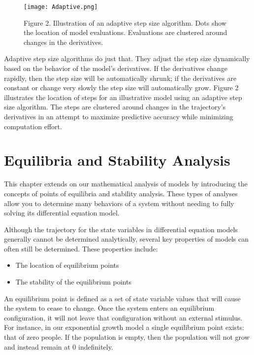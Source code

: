 \documentclass[]{memoir}
\makeatletter
\def\maxwidth{\ifdim\Gin@nat@width>\linewidth\linewidth
\else\Gin@nat@width\fi}
\let\Oldincludegraphics\includegraphics
\renewcommand{\includegraphics}[1]{\Oldincludegraphics[width=\maxwidth]{#1}}
\makeatother
\begin{document}
\begin{figure}[htbp]
\centering
\texttt{[image: Adaptive.png]}
\caption{Figure 2. Illustration of an adaptive step size algorithm. Dots
show the location of model evaluations. Evaluations are clustered around
changes in the derivatives.}
\end{figure}

Adaptive step size algorithms do just that. They adjust the step size
dynamically based on the behavior of the model's derivatives. If the
derivatives change rapidly, then the step size will be automatically
shrunk; if the derivatives are constant or change very slowly the step
size will automatically grow. Figure 2 illustrates the location of steps
for an illustrative model using an adaptive step size algorithm. The
steps are clustered around changes in the trajectory's derivatives in an
attempt to maximize predictive accuracy while minimizing computation
effort.

\chapter{Equilibria and Stability Analysis}

This chapter extends on our mathematical analysis of models by
introducing the concepts of points of equilibria and stability analysis.
These types of analyses allow you to determine many behaviors of a
system without needing to fully solving its differential equation model.

Although the trajectory for the state variables in differential equation
models generally cannot be determined analytically, several key
properties of models can often still be determined. These properties
include:

\begin{itemize}
\itemsep1pt\parskip0pt
\item
  The location of equilibrium points
\item
  The stability of the equilibrium points
\end{itemize}

An equilibrium point is defined as a set of state variable values that
will cause the system to cease to change. Once the system enters an
equilibrium configuration, it will not leave that configuration without
an external stimulus. For instance, in our exponential growth model a
single equilibrium point exists: that of zero people. If the population
is empty, then the population will not grow and instead remain at 0
indefinitely.
\end{document}
